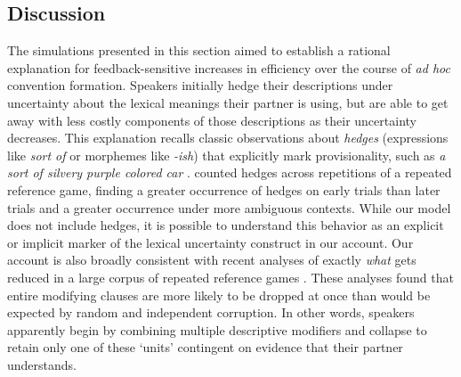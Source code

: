 \subsection{Discussion}

The simulations presented in this section aimed to establish a rational explanation for feedback-sensitive increases in efficiency over the course of \emph{ad hoc} convention formation.
Speakers initially hedge their descriptions under uncertainty about the lexical meanings their partner is using, but are able to get away with less costly components of those descriptions as their uncertainty decreases.
This explanation recalls classic observations about \emph{hedges} (expressions like \emph{sort of} or morphemes like \emph{-ish}) that explicitly mark provisionality, such as \emph{a sort of silvery purple colored car} \cite{lakoff1975hedges,Fraser10_Hedging,MedlockBriscoe07_HedgeClassification}.
 counted hedges across repetitions of a repeated reference game, finding a greater occurrence of hedges on early trials than later trials and a greater occurrence under more ambiguous contexts.
While our model does not include hedges, it is possible to understand this behavior as an explicit or implicit marker of the lexical uncertainty construct in our account.
Our account is also broadly consistent with recent analyses of exactly \emph{what} gets reduced in a large corpus of repeated reference games \cite{hawkins2020characterizing}.
These analyses found that entire modifying clauses are more likely to be dropped at once than would be expected by random and independent corruption.
In other words, speakers apparently begin by combining multiple descriptive modifiers and collapse to retain only one of these `units' contingent on evidence that their partner understands.

